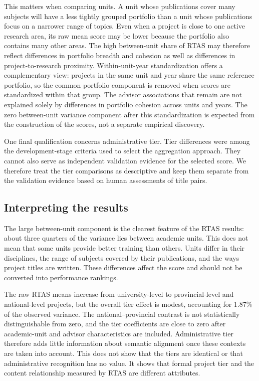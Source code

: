 \documentclass[pdflatex,sn-apa]{sn-jnl}
\begin{document}
This matters when comparing units. A unit whose publications cover many subjects will have a less tightly grouped portfolio than a unit whose publications focus on a narrower range of topics. Even when a project is close to one active research area, its raw mean score may be lower because the portfolio also contains many other areas. The high between-unit share of RTAS may therefore reflect differences in portfolio breadth and cohesion as well as differences in project-to-research proximity. Within-unit-year standardization offers a complementary view: projects in the same unit and year share the same reference portfolio, so the common portfolio component is removed when scores are standardized within that group. The advisor associations that remain are not explained solely by differences in portfolio cohesion across units and years. The zero between-unit variance component after this standardization is expected from the construction of the scores, not a separate empirical discovery.

One final qualification concerns administrative tier. Tier differences were among the development-stage criteria used to select the aggregation approach. They cannot also serve as independent validation evidence for the selected score. We therefore treat the tier comparisons as descriptive and keep them separate from the validation evidence based on human assessments of title pairs.

\subsection{Interpreting the results}

The large between-unit component is the clearest feature of the RTAS results: about three quarters of the variance lies between academic units. This does not mean that some units provide better training than others. Units differ in their disciplines, the range of subjects covered by their publications, and the ways project titles are written. These differences affect the score and should not be converted into performance rankings.

The raw RTAS means increase from university-level to provincial-level and national-level projects, but the overall tier effect is modest, accounting for 1.87\% of the observed variance. The national--provincial contrast is not statistically distinguishable from zero, and the tier coefficients are close to zero after academic-unit and advisor characteristics are included. Administrative tier therefore adds little information about semantic alignment once these contexts are taken into account. This does not show that the tiers are identical or that administrative recognition has no value. It shows that formal project tier and the content relationship measured by RTAS are different attributes.
\end{document}
